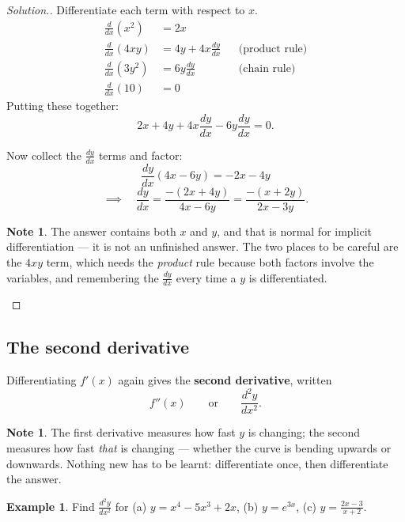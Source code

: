 \documentclass[11pt,a4paper]{article}
\theoremstyle{definition}
\newtheorem{example}[thm]{Example}
\newtheorem{note}[thm]{Note}
\newenvironment{solution}
  {\renewcommand{\qedsymbol}{}\begin{proof}[\textit{Solution}.]}
  {\end{proof}}
\begin{document}
\begin{solution}
Differentiate each term with respect to $x$.
\begin{align*}
\frac{d}{dx}\left(x^2\right) &= 2x\\
\frac{d}{dx}(4xy) &= 4y+4x\frac{dy}{dx} &&\text{(product rule)}\\
\frac{d}{dx}\left(3y^2\right) &= 6y\frac{dy}{dx} &&\text{(chain rule)}\\
\frac{d}{dx}(10) &= 0
\end{align*}
Putting these together:
$$2x+4y+4x\frac{dy}{dx}-6y\frac{dy}{dx}=0.$$

Now collect the $\frac{dy}{dx}$ terms and factor:
$$\frac{dy}{dx}\left(4x-6y\right)=-2x-4y$$
$$\implies\quad \frac{dy}{dx}=\frac{-(2x+4y)}{4x-6y}=\frac{-(x+2y)}{2x-3y}.$$

\begin{note}
The answer contains both $x$ and $y$, and that is normal for implicit differentiation ---
it is not an unfinished answer. The two places to be careful are the $4xy$ term, which
needs the \emph{product} rule because both factors involve the variables, and remembering
the $\frac{dy}{dx}$ every time a $y$ is differentiated.
\end{note}
\end{solution}

\subsection{The second derivative}

Differentiating $f'(x)$ again gives the \textbf{second derivative}, written
$$f''(x)\qquad\text{or}\qquad \frac{d^2y}{dx^2}.$$

\begin{note}
The first derivative measures how fast $y$ is changing; the second measures how fast
\emph{that} is changing --- whether the curve is bending upwards or downwards. Nothing
new has to be learnt: differentiate once, then differentiate the answer.
\end{note}

\begin{example}
Find $\frac{d^2y}{dx^2}$ for \quad (a) $y=x^4-5x^3+2x$, \quad (b) $y=e^{3x}$, \quad
(c) $y=\frac{2x-3}{x+2}$.
\end{example}
\end{document}
